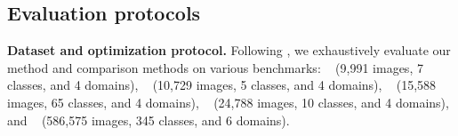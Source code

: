 
\subsection{Evaluation protocols}
\label{section:s__evaluation_protocols}

\textbf{Dataset and optimization protocol.}
Following \citet{gulrajani2020domainbed}, we exhaustively evaluate our method and comparison methods on various benchmarks: ~\cite{li2017pacs} (9,991 images, 7 classes, and 4 domains), ~\cite{fang2013vlcs} (10,729 images, 5 classes, and 4 domains), ~\cite{venkateswara2017officehome} (15,588 images, 65 classes, and 4 domains), ~\cite{beery2018terraincognita} (24,788 images, 10 classes, and 4 domains), and ~\cite{peng2019domainnet} (586,575 images, 345 classes, and 6 domains). 

